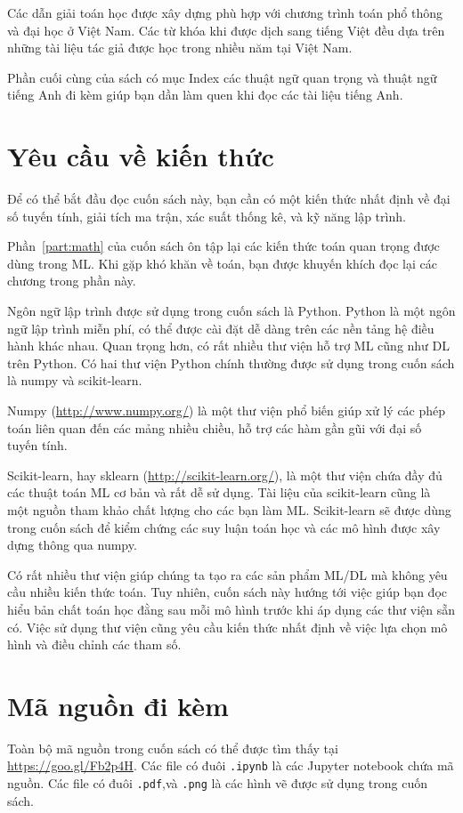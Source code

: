 Các dẫn giải toán học được xây dựng phù hợp với chương trình toán phổ thông và
đại học ở Việt Nam. Các từ khóa khi được dịch sang tiếng Việt đều dựa trên những
tài liệu tác giả được học trong nhiều năm tại Việt Nam.

Phần cuối cùng của sách có mục Index các thuật ngữ quan trọng và thuật ngữ tiếng Anh đi kèm giúp bạn dần làm quen khi đọc các tài liệu tiếng Anh. 


\section{Yêu cầu về kiến thức}

Để có thể bắt đầu đọc cuốn sách này, bạn cần có một kiến thức nhất định về đại
số tuyến tính, giải tích ma trận, xác suất thống kê, và kỹ năng lập trình.

Phần~\ref{part:math} của cuốn sách ôn tập lại các kiến thức toán quan trọng được
dùng trong ML. Khi gặp khó khăn về toán, bạn được khuyến khích đọc lại các
chương trong phần này.

Ngôn ngữ lập trình được sử dụng trong cuốn sách là Python. Python là một ngôn
ngữ lập trình miễn phí, có thể được cài đặt dễ dàng trên các nền tảng hệ điều
hành khác nhau. Quan trọng hơn, có rất nhiều thư viện hỗ trợ ML cũng như DL
trên Python. Có hai thư viện Python chính thường được sử dụng trong
cuốn sách là numpy và scikit-learn. 

Numpy (\url{http://www.numpy.org/}) là một thư viện phổ biến giúp xử lý các phép
toán liên quan đến các mảng nhiều chiều, hỗ trợ các hàm gần gũi với đại số tuyến
tính.

Scikit-learn, hay sklearn (\url{http://scikit-learn.org/}), là một thư viện chứa
đầy đủ các thuật toán ML cơ bản và rất dễ sử dụng. Tài liệu của scikit-learn
cũng là một nguồn tham khảo chất lượng cho các bạn làm ML. Scikit-learn sẽ được
dùng trong cuốn sách để kiểm chứng các suy luận toán học và các mô hình được xây
dựng thông qua numpy.

Có rất nhiều thư viện giúp chúng ta tạo ra các sản phẩm ML/DL mà không yêu
cầu nhiều kiến thức toán. Tuy nhiên, cuốn sách này hướng tới việc giúp bạn đọc
hiểu bản chất toán học đằng sau mỗi mô hình trước khi áp dụng các thư viện sẵn
có. Việc sử dụng thư viện cũng yêu cầu kiến thức nhất định về việc lựa chọn mô
hình và điều chỉnh các tham số.
\section{Mã nguồn đi kèm}
Toàn bộ mã nguồn trong cuốn sách có thể được tìm thấy tại
\url{https://goo.gl/Fb2p4H}. Các file có đuôi \texttt{.ipynb} là các
Jupyter notebook chứa mã nguồn. Các file có đuôi \texttt{.pdf},và \texttt{.png}
là các hình vẽ được sử dụng trong cuốn sách.


